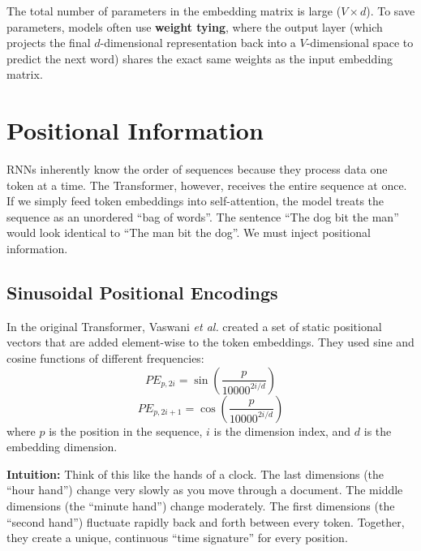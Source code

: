 \documentclass[11pt, a4paper]{article}
\begin{document}
The total number of parameters in the embedding matrix is large ($V \times d$). To save parameters, models often use \textbf{weight tying}, where the output layer (which projects the final $d$-dimensional representation back into a $V$-dimensional space to predict the next word) shares the exact same weights as the input embedding matrix.

\section{Positional Information}

RNNs inherently know the order of sequences because they process data one token at a time. The Transformer, however, receives the entire sequence at once. If we simply feed token embeddings into self-attention, the model treats the sequence as an unordered ``bag of words''. The sentence ``The dog bit the man'' would look identical to ``The man bit the dog''. We must inject positional information.

\subsection{Sinusoidal Positional Encodings}
In the original Transformer, Vaswani \textit{et al.} created a set of static positional vectors that are added element-wise to the token embeddings. They used sine and cosine functions of different frequencies:
$$ PE_{p,2i} = \sin\left(\frac{p}{10000^{2i/d}}\right) $$
$$ PE_{p,2i+1} = \cos\left(\frac{p}{10000^{2i/d}}\right) $$
where $p$ is the position in the sequence, $i$ is the dimension index, and $d$ is the embedding dimension.

\textbf{Intuition:} Think of this like the hands of a clock. The last dimensions (the ``hour hand'') change very slowly as you move through a document. The middle dimensions (the ``minute hand'') change moderately. The first dimensions (the ``second hand'') fluctuate rapidly back and forth between every token. Together, they create a unique, continuous ``time signature'' for every position.
\end{document}
